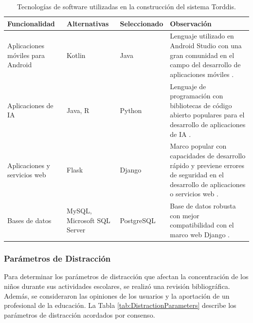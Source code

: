 \documentclass[a4paper,fleqn]{cas-sc}
\begin{document}
					\begin{table}[hbt]
						\caption{Tecnologías de software utilizadas en la construcción del sistema Torddis.}
						\label{table:software-technologies}
						\centering
						\begin{tabular}{p{}p{0.15\textwidth}p{}p{}}
							\hline
							\multicolumn{1}{l}{\textbf{Funcionalidad}} & \multicolumn{1}{l}{\textbf{Alternativas }} & \multicolumn{1}{l}{\textbf{Seleccionado}} & \multicolumn{1}{l}{\textbf{Observación}} \\ \hline
							Aplicaciones móviles para Android & Kotlin & Java & Lenguaje utilizado en Android Studio con una gran comunidad en el campo del desarrollo de aplicaciones móviles \citep{Sharma2021Real-Time}. \\
							Aplicaciones de IA & Java, R & Python & Lenguaje de programación con bibliotecas de código abierto populares para el desarrollo de aplicaciones de IA \citep{Cai2005OnThePerformance}. \\
							Aplicaciones y servicios web & Flask & Django & Marco popular con capacidades de desarrollo rápido y previene errores de seguridad en el desarrollo de aplicaciones o servicios web \citep{Puneet2022ADjango}. \\
							Bases de datos & MySQL, Microsoft SQL Server & PostgreSQL & Base de datos robusta con mejor compatibilidad con el marco web Django \citep{Puneet2022ADjango}. \\ \hline
						\end{tabular}
					\end{table}
					
				\subsubsection*{Parámetros de Distracción}
					Para determinar los parámetros de distracción que afectan la concentración de los niños durante sus actividades escolares, se realizó una revisión bibliográfica. Además, se consideraron las opiniones de los usuarios y la aportación de un profesional de la educación. La Tabla \ref{tab:DistractionParameters} describe los parámetros de distracción acordados por consenso.
					
\end{document}
